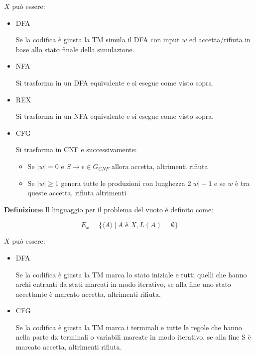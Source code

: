 \documentclass{article}
\begin{document}
\noindent $X$ può essere:
\begin{itemize}
    \item DFA

    Se la codifica è giusta la TM simula il DFA con input $w$ ed accetta/rifiuta in base allo stato finale della simulazione.
    
    \item NFA

    Si trasforma in un DFA equivalente e si esegue come visto sopra.
    
    \item REX

    Si trasforma in un NFA equivalente e si esegue come visto sopra.
    
    \item CFG

    Si trasforma in CNF e successivamente:
    \begin{itemize}
        \item Se $|w|=0 \text{ e } S\rightarrow \epsilon\in G_{CNF}$ allora accetta, altrimenti rifiuta

        \item Se $|w|\geq1$ genera tutte le produzioni con lunghezza $2|w|-1$ e se $w$ è tra queste accetta, rifiuta altrimenti\newline
        
    \end{itemize}
    
\end{itemize}

\newpage

\noindent\textbf{Definizione} Il linguaggio per il problema del vuoto è definito come:

$$E_x=\{\langle A\rangle\ |\ A\text{ è } X,L(A)=\emptyset \}$$\newline

\noindent $X$ può essere:
\begin{itemize}
    \item DFA

    Se la codifica è giusta la TM marca lo stato iniziale e tutti quelli che hanno archi entranti da stati marcati in modo iterativo, se alla fine uno stato accettante è marcato accetta, altrimenti rifiuta.
    
    \item CFG

    Se la codifica è giusta la TM marca i terminali e tutte le regole che hanno nella parte dx terminali o variabili marcate in modo iterativo, se alla fine S è marcato accetta, altrimenti rifiuta.\newline
    
\end{itemize}
\end{document}
